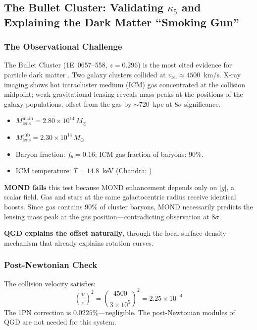 
\subsection{The Bullet Cluster: Validating $\kappa_5$ and Explaining the Dark Matter ``Smoking Gun''}
\label{sec:bullet}

\subsubsection{The Observational Challenge}

The Bullet Cluster (1E~0657--558, $z=0.296$) is the most cited evidence
for particle dark matter \citep{Clowe2006, Bradac2006}.
Two galaxy clusters collided at $v_\text{rel} \approx 4500$~km/s.
X-ray imaging shows hot intracluster medium (ICM) gas concentrated
at the collision midpoint; weak gravitational lensing reveals mass
peaks at the positions of the galaxy populations, offset from the gas by
$\sim720$~kpc at 8$\sigma$ significance.

\begin{itemize}
	\item $M_\text{lens}^\text{main} = 2.80 \times 10^{14}\,M_\odot$ \citep{Clowe2006}
	\item $M_\text{lens}^\text{sub}  = 2.30 \times 10^{14}\,M_\odot$
	\item Baryon fraction: $f_b = 0.16$; ICM gas fraction of baryons: 90\%.
	\item ICM temperature: $T = 14.8$~keV (Chandra; \citealt{Markevitch2004})
\end{itemize}

\textbf{MOND fails} this test because MOND enhancement depends only on $|g|$,
a scalar field. Gas and stars at the same galactocentric radius receive identical
boosts. Since gas contains 90\% of cluster baryons, MOND necessarily predicts
the lensing mass peak at the gas position—contradicting observation at $8\sigma$.

\textbf{QGD explains the offset naturally}, through the local surface-density
mechanism that already explains rotation curves.

\subsubsection{Post-Newtonian Check}

The collision velocity satisfies:
\begin{equation}
	\left(\frac{v}{c}\right)^2 = \left(\frac{4500}{3\times10^5}\right)^2 = 2.25\times10^{-4}
\end{equation}
The 1PN correction is $0.0225\%$—negligible. The post-Newtonian modules of QGD
are not needed for this system.

